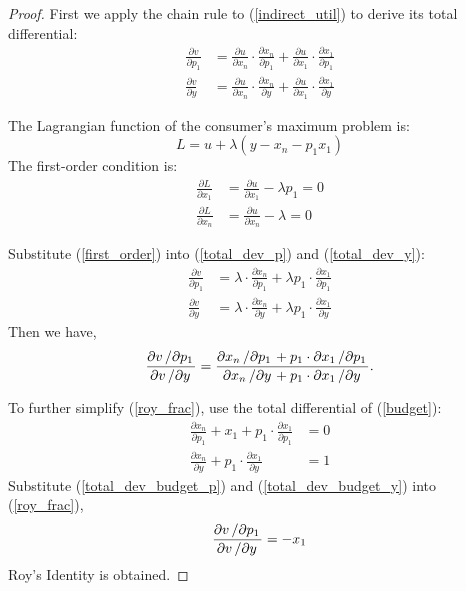 \documentclass[12pt,a4paper]{article}
\theoremstyle{plain}%
\theoremstyle{definition}
\theoremstyle{remark}
\newcommand{\partfrac}[2]{\frac{\partial #1}{\partial #2}}
\newcommand{\partline}[2]{\partial #1 \left/ \partial #2 \right.}
\begin{document}
\begin{proof}\label{pf:roy}
	First we apply the chain rule to (\ref{indirect_util}) to derive its total differential: 
	\begin{align} 
		\label{total_dev_p}
		\partfrac{v}{p_1} &= \partfrac{u}{x_n} \cdot \partfrac{x_n}{p_1} + 
							 \partfrac{u}{x_1} \cdot \partfrac{x_1}{p_1} \\
		\label{total_dev_y}
		\partfrac{v}{y} &= \partfrac{u}{x_n} \cdot \partfrac{x_n}{y} + 
						   \partfrac{u}{x_1} \cdot \partfrac{x_1}{y} 
	\end{align}
	
	The Lagrangian function of the consumer's maximum problem is: 
	\begin{equation} \label{Lagrangian}
		L = u + \lambda (y - x_n - p_1 x_1)
	\end{equation}
	The first-order condition is: 
	\begin{align} \label{first_order}
		\partfrac{L}{x_1} &= \partfrac{u}{x_1} - \lambda p_1 = 0 \\
		\partfrac{L}{x_n} &= \partfrac{u}{x_n} - \lambda = 0 
	\end{align}
	
	Substitute (\ref{first_order}) into (\ref{total_dev_p}) and (\ref{total_dev_y}): 
	\begin{align} 
		\label{total_dev_p_opt}
		\partfrac{v}{p_1} &= \lambda \cdot \partfrac{x_n}{p_1} + 
							 \lambda p_1 \cdot \partfrac{x_1}{p_1} \\
		\label{total_dev_y_opt}
		\partfrac{v}{y} &= \lambda \cdot \partfrac{x_n}{y} + 
						   \lambda p_1 \cdot \partfrac{x_1}{y}
	\end{align}
	Then we have, 
	\begin{equation} 
		\label{roy_frac}
		\frac{\partline{v}{p_1}}{\partline{v}{y}} = 
		\frac{\partline{x_n}{p_1} + p_1 \cdot \partline{x_1}{p_1}}%
			 {\partline{x_n}{y} + p_1 \cdot \partline{x_1}{y}}. 
	\end{equation}
	
	To further simplify (\ref{roy_frac}), use the total differential of (\ref{budget}): 
	\begin{align}
		\label{total_dev_budget_p}
		\partfrac{x_n}{p_1} + x_1 + p_1 \cdot \partfrac{x_1}{p_1} &= 0 \\
		\label{total_dev_budget_y}
		\partfrac{x_n}{y} + p_1 \cdot \partfrac{x_1}{y} &= 1
	\end{align}
	Substitute (\ref{total_dev_budget_p}) and (\ref{total_dev_budget_y}) into (\ref{roy_frac}), 
	\begin{equation}
		\frac{\partline{v}{p_1}}{\partline{v}{y}} = -x_1
	\end{equation}
	Roy's Identity is obtained. 
\end{proof}
\end{document}
